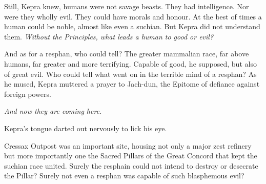 \documentclass
  [a4paper,
   12pt,
   oneside
  ]%
  {article}
\begin{document}
Still, Kepra knew, humans were not savage beasts. They had intelligence. Nor were they wholly evil. They could have morals and honour. At the best of times a human could be noble, almost like even a suchian. But Kepra did not understand them. \emph{Without the Principles, what leads a human to good or evil?} 

And as for a resphan, who could tell? The greater mammalian race, far above humans, far greater and more terrifying. Capable of good, he supposed, but also of great evil. Who could tell what went on in the terrible mind of a resphan? As he mused, Kepra muttered a prayer to Jach-dun, the Epitome of defiance against foreign powers.

\emph{And now they are coming here.} 

Kepra’s tongue darted out nervously to lick his eye.



Cressax Outpost was an important site, housing not only a major zest refinery but more importantly one the Sacred Pillars of the Great Concord that kept the suchian race united. Surely the resphain could not intend to destroy or desecrate the Pillar? Surely not even a resphan was capable of such blasphemous evil? 
\end{document}
